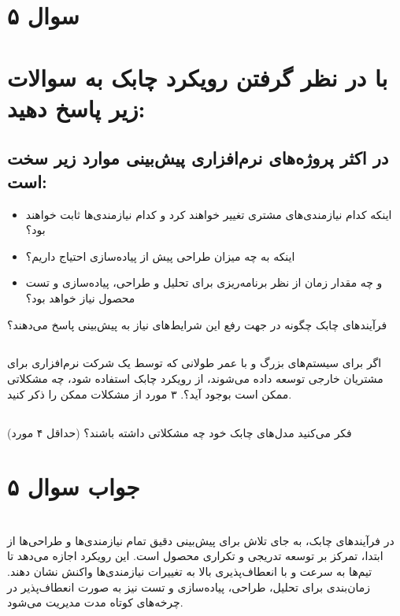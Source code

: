 \section*{سوال ۵}

\section*{با در نظر گرفتن رویکرد چابک به سوالات زیر پاسخ دهید:}
\subsection*{ در اکثر پروژه‌های نرم‌افزاری پیش‌بینی موارد زیر سخت است:}
\begin{itemize}
	\item اینکه کدام نیازمندی‌های مشتری تغییر خواهند کرد و کدام نیازمندی‌ها ثابت خواهند بود؟
	\item اینکه به چه میزان طراحی پیش از پیاده‌سازی احتیاج داریم؟
	\item و چه مقدار زمان از نظر برنامه‌ریزی برای تحلیل و طراحی، پیاده‌سازی و تست محصول نیاز خواهد بود؟
\end{itemize}
فرآیندهای چابک چگونه در جهت رفع این شرایط‌های نیاز به پیش‌بینی پاسخ می‌دهند؟

\subsection*{}
 اگر برای سیستم‌های بزرگ و با عمر طولانی که توسط یک شرکت نرم‌افزاری برای مشتریان خارجی توسعه داده می‌شوند، از رویکرد چابک استفاده شود، چه مشکلاتی ممکن است بوجود آید؟. ۳ مورد از مشکلات ممکن را ذکر کنید.

\subsection*{}
 فکر می‌کنید مدل‌های چابک خود چه مشکلاتی داشته باشند؟ (حداقل ۴ مورد)

\section*{جواب سوال ۵}

\section*{}
در فرآیندهای چابک، به جای تلاش برای پیش‌بینی دقیق تمام نیازمندی‌ها و طراحی‌ها از ابتدا، تمرکز بر توسعه تدریجی و تکراری محصول است. این رویکرد اجازه می‌دهد تا تیم‌ها به سرعت و با انعطاف‌پذیری بالا به تغییرات نیازمندی‌ها واکنش نشان دهند. زمان‌بندی برای تحلیل، طراحی، پیاده‌سازی و تست نیز به صورت انعطاف‌پذیر در چرخه‌های کوتاه مدت مدیریت می‌شود.

